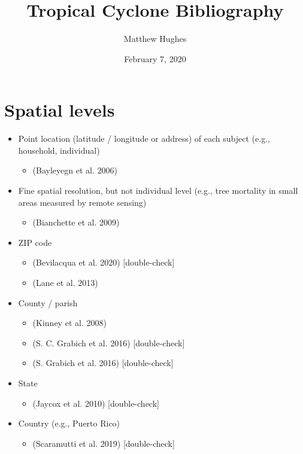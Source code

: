 \documentclass[
]{article}
\title{Tropical Cyclone Bibliography}
\author{Matthew Hughes}
\date{February 7, 2020}
\providecommand{\tightlist}{%
  \setlength{\itemsep}{0pt}\setlength{\parskip}{0pt}}
\begin{document}
\maketitle

\hypertarget{spatial-levels}{%
\section{Spatial levels}\label{spatial-levels}}

\begin{itemize}
\tightlist
\item
  Point location (latitude / longitude or address) of each subject
  (e.g., household, individual)

  \begin{itemize}
  \tightlist
  \item
    (Bayleyegn et al. 2006)
  \end{itemize}
\item
  Fine spatial resolution, but not individual level (e.g., tree
  mortality in small areas measured by remote sensing)

  \begin{itemize}
  \tightlist
  \item
    (Bianchette et al. 2009)
  \end{itemize}
\item
  ZIP code

  \begin{itemize}
  \tightlist
  \item
    (Bevilacqua et al. 2020) {[}double-check{]}
  \item
    (Lane et al. 2013)
  \end{itemize}
\item
  County / parish

  \begin{itemize}
  \tightlist
  \item
    (Kinney et al. 2008)
  \item
    (S. C. Grabich et al. 2016) {[}double-check{]}
  \item
    (S. Grabich et al. 2016) {[}double-check{]}
  \end{itemize}
\item
  State

  \begin{itemize}
  \tightlist
  \item
    (Jaycox et al. 2010) {[}double-check{]}
  \end{itemize}
\item
  Country (e.g., Puerto Rico)

  \begin{itemize}
  \tightlist
  \item
    (Scaramutti et al. 2019) {[}double-check{]}
  \end{itemize}
\end{itemize}
\end{document}
